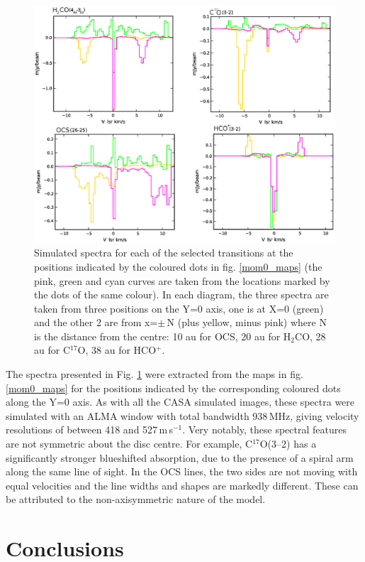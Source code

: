 \documentclass[useAMS,usenatbib]{mn2e}
\begin{document}
\begin{figure}
 \includegraphics[width=168mm]{Figures/sim/casa_all_spectra2.eps}
 \caption{Simulated spectra for each of the selected transitions at the positions indicated by the coloured dots in fig. \ref{mom0_maps} (the pink, green and cyan curves are taken from the locations marked by the dots of the same colour). In each diagram, the three spectra are taken from three positions on the Y=0 axis, one is at X=0 (green) and the other 2 are from x=$\pm\,$N (plus yellow, minus pink) where N is the distance from the centre: 10 au for OCS, 20 au for H$_2$CO, 28 au for C$^{17}$O, 38 au for HCO$^+$.}
 \label{spectra}
\end{figure}

The spectra presented in Fig. \ref{spectra} were extracted from the maps in fig. \ref{mom0_maps} for the positions indicated by the corresponding coloured dots along the Y=0 axis. As with all the CASA simulated images, these spectra were simulated with an ALMA window with total bandwidth 938$\,$MHz, giving velocity resolutions of between 418 and 527\,m\,s$^{-1}$. Very notably, these spectral features are not symmetric about the disc centre. For example, C$^{17}$O(3--2) has a significantly stronger blueshifted absorption, due to the presence of a spiral arm along the same line of sight. In the OCS lines, the two sides are not moving with equal velocities and the line widths and shapes are markedly different. These can be attributed to the non-axisymmetric nature of the model.

\section{Conclusions} \label{sec:discussion}
\end{document}
